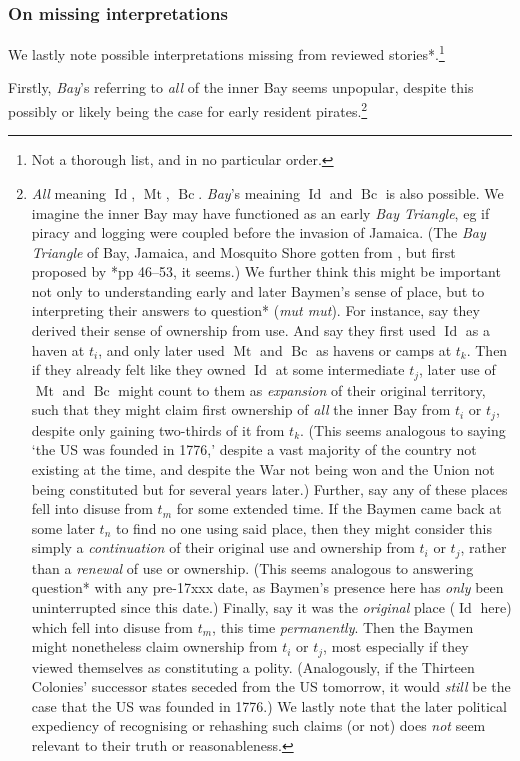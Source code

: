 \documentclass{amsart}
\newcommand{\ment}[1]{\textit{#1}} %
\newcommand{\forn}[1]{\textit{#1}} %
\DeclareMathOperator{\id}{Id} %
\DeclareMathOperator{\mt}{Mt} %
\DeclareMathOperator{\bc}{Bc} %
\theoremstyle{definition}
\theoremstyle{remark}
\begin{document}
		\subsubsection{On missing interpretations}
		\label{sss:onmissinginterpret}
		We lastly note possible interpretations missing from reviewed stories*.\footnote{Not a thorough list, and in no particular order.} 
		
		Firstly, \ment{Bay}'s referring to \emph{all} of the inner Bay seems unpopular, despite this possibly or likely being the case for early resident pirates.\footnote{\ment{All} meaning \(\id\), \(\mt\), \(\bc\). \ment{Bay}'s meaining \(\id\) and \(\bc\) is also possible. We imagine the inner Bay may have functioned as an early \ment{Bay Triangle}, eg if piracy and logging were coupled before the invasion of Jamaica. (The \ment{Bay Triangle} of Bay, Jamaica, and Mosquito Shore gotten from , but first proposed by \cite{nay89}*{pp 46--53}, it seems.) We further think this might be important not only to understanding early and later Baymen's sense of place, but to interpreting their answers to question* (\forn{mut mut}). For instance, say they derived their sense of ownership from use. And say they first used \(\id\) as a haven at \(t_i\), and only later used \(\mt\) and \(\bc\) as havens or camps at \(t_k\). Then if they already felt like they owned \(\id\) at some intermediate \(t_j\), later use of \(\mt\) and \(\bc\) might count to them as \emph{expansion} of their original territory, such that they might claim first ownership of \emph{all} the inner Bay from \(t_i\) or \(t_j\), despite only gaining two-thirds of it from \(t_k\). (This seems analogous to saying `the US was founded in 1776,' despite a vast majority of the country not existing at the time, and despite the War not being won and the Union not being constituted but for several years later.) Further, say any of these places fell into disuse from \(t_m\) for some extended time. If the Baymen came back at some later \(t_n\) to find no one using said place, then they might consider this simply a \emph{continuation} of their original use and ownership from \(t_i\) or \(t_j\), rather than a \emph{renewal} of use or ownership. (This seems analogous to answering question* with any pre-17xxx date, as Baymen's presence here has \emph{only} been uninterrupted since this date.) Finally, say it was the \emph{original} place (\(\id\) here) which fell into disuse from \(t_m\), this time \emph{permanently}. Then the Baymen might nonetheless claim ownership from \(t_i\) or \(t_j\), most especially if they viewed themselves as constituting a polity. (Analogously, if the Thirteen Colonies' successor states seceded from the US tomorrow, it would \emph{still} be the case that the US was founded in 1776.) We lastly note that the later political expediency of recognising or rehashing such claims (or not) does \emph{not} seem relevant to their truth or reasonableness.}
		
\end{document}
